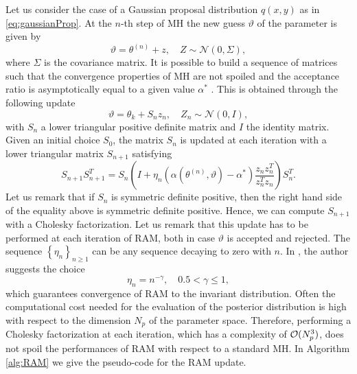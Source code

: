 Let us consider the case of a Gaussian proposal distribution $q(x,y)$ as in \eqref{eq:gaussianProp}. At the $n$-th step of MH the new guess $\vartheta$ of the parameter is given by
\begin{equation}
\vartheta = \theta^{(n)} + z, \quad Z \sim \mathcal{N}(0, \Sigma),
\end{equation}
where $\Sigma$ is the covariance matrix. It is possible to build a sequence of matrices such that the convergence properties of MH are not spoiled and the acceptance ratio is asymptotically equal to a given value $\alpha^*$ \cite{Vih12}. This is obtained through the following update 
\begin{equation}
\vartheta = \theta_k + S_n z_n, \quad Z_n \sim \mathcal{N}(0, I),
\end{equation}
with $S_n$ a lower triangular positive definite matrix and $I$ the identity matrix. Given an initial choice $S_0$, the matrix $S_n$ is updated at each iteration with a lower triangular matrix $S_{n+1}$ satisfying
\begin{equation}\label{eq:RAMupdate}
S_{n+1}S_{n+1}^T = S_n\left(I + \eta_n\left(\alpha(\theta^{(n)}, \vartheta) - \alpha^*\right)\frac{z_nz_n^T}{z_n^Tz_n}\right)S_n^T.
\end{equation}
Let us remark that if $S_n$ is symmetric definite positive, then the right hand side of the equality above is symmetric definite positive. Hence, we can compute $S_{n+1}$ with a Cholesky factorization. Let us remark that this update has to be performed at each iteration of RAM, both in case $\vartheta$ is accepted and rejected. The sequence $\left\{\eta_n\right\}_{n\geq 1}$ can be any sequence decaying to zero with $n$. In \cite{Vih12}, the author suggests the choice
\begin{equation}
\eta_n = n^{-\gamma}, \quad 0.5 < \gamma \leq 1,
\end{equation}
which guarantees convergence of RAM to the invariant distribution. Often the computational cost needed for the evaluation of the posterior distribution is high with respect to the dimension $N_p$ of the parameter space. Therefore, performing a Cholesky factorization at each iteration, which has a complexity of $\mathcal{O}(N_p^3)$, does not spoil the performances of RAM with respect to a standard MH. In Algorithm \ref{alg:RAM} we give the pseudo-code for the RAM update.

